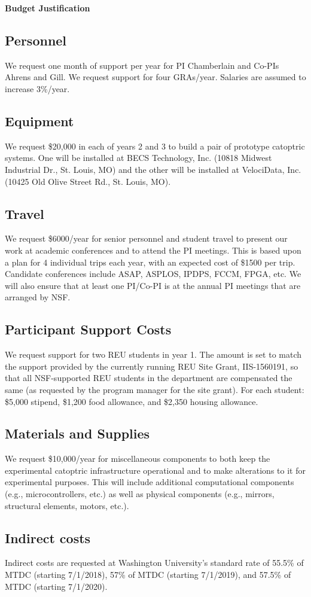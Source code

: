 \documentclass[11pt]{article}
\begin{document}
\pagestyle{empty}
\thispagestyle{empty}

\begin{center}
\textbf{\Large Budget Justification}
\end{center}

\subsection*{Personnel}
We request one month of support per year for PI Chamberlain and Co-PIs
Ahrens and Gill.
We request support for four GRAs/year. Salaries are 
assumed to increase 3\%/year. 

\subsection*{Equipment}
We request \$20,000 in each of years 2 and 3 to build a pair of
prototype catoptric systems.  One will be installed at
BECS Technology, Inc. (10818 Midwest Industrial Dr., St. Louis, MO)
and the other will be installed at VelociData, Inc. (10425 Old Olive
Street Rd., St. Louis, MO).

\subsection*{Travel}
We request \$6000/year for senior personnel and student travel
to present our work at academic 
conferences and to attend the PI meetings.
This is based upon a plan for 4 individual trips
each year, with an expected cost of \$1500 per trip.
Candidate conferences include ASAP, ASPLOS, IPDPS, FCCM, FPGA, etc.
We will also ensure that at least one PI/Co-PI is
at the annual PI meetings that are arranged by NSF. 

\subsection*{Participant Support Costs}
We request support for two REU students in year 1. 
The amount is set to match the support provided by the currently
running REU Site Grant, IIS-1560191, so that all NSF-supported REU
students in the department are compensated the same (as requested by
the program manager for the site grant).
For each student: \$5,000 stipend, \$1,200 food allowance, and \$2,350
housing allowance.

\subsection*{Materials and Supplies}
We request \$10,000/year for
miscellaneous components to both keep the experimental catoptric
infrastructure operational and to make alterations to it for
experimental purposes. This will
include additional computational components (e.g., microcontrollers, etc.)
as well as physical components (e.g., mirrors, structural elements, motors,
etc.).

\subsection*{Indirect costs}
Indirect costs are requested at Washington University's standard rate of
55.5\% of MTDC (starting 7/1/2018), 57\% of MTDC (starting 7/1/2019), and
57.5\% of MTDC (starting 7/1/2020).
\end{document}
